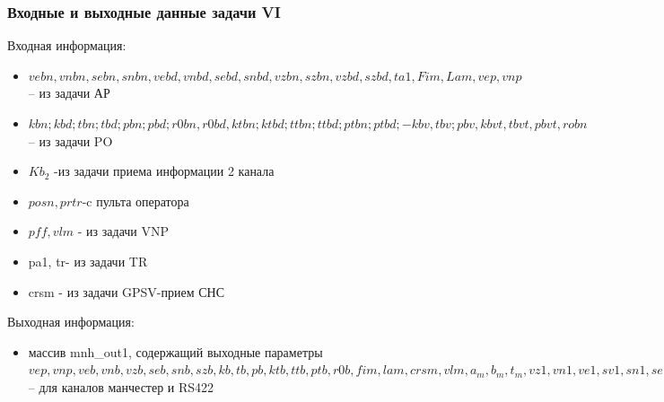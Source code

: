 \subsubsection{Входные и выходные данные задачи VI}
Входная информация:    
\begin{itemize}
\item $vebn, vnbn, sebn, snbn, vebd, vnbd, sebd, snbd, vzbn, szbn, vzbd, szbd, ta1, Fim, Lam, vep, vnp$ – из задачи АР
\item $kbn; kbd;   tbn;  tbd;   pbn;  pbd; r0bn,   r0bd ,ktbn; ktbd; ttbn; ttbd; ptbn; ptbd;-kbv, tbv; pbv, kbvt, tbvt, pbvt, robn$– из задачи PO
\item $Kb_2$ -из задачи приема информации 2 канала
\item $posn, prtr$-c  пульта оператора
\item $pff, vlm$ - из задачи VNP
\item pa1, tr- из задачи TR
\item crsm - из задачи GPSV-прием СНС
\end{itemize}
Выходная информация:
\begin{itemize}
    \item массив mnh_out1,   содержащий выходные параметры $vep, vnp, veb, vnb, vzb, seb, snb, szb, kb, tb, pb, ktb, ttb, ptb, r0b, fim, lam, crsm, vlm , 
    a_m, b_m,  t_m, vz1,  vn1,   ve1,  sv1,  sn1,   se1$   – для  каналов  манчестер и RS422
\end{itemize}
